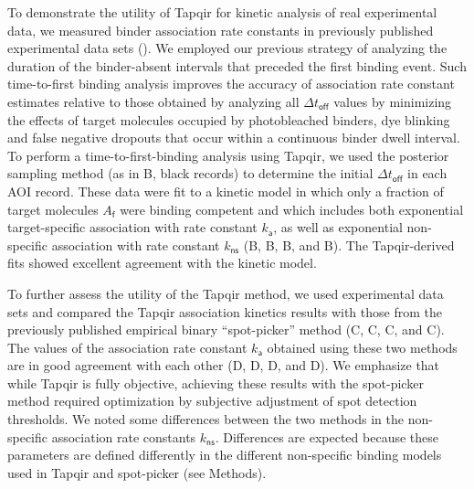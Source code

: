 To demonstrate the utility of Tapqir for kinetic analysis of real experimental data, we measured binder association rate constants in previously published experimental data sets ().  We employed our previous strategy  \citep{Friedman2012-if,Friedman2015-nx} of analyzing the duration of the binder-absent intervals that preceded the first binding event.  Such time-to-first binding analysis improves the accuracy of association rate constant estimates relative to those obtained by analyzing all $\Delta t_\mathsf{off}$ values by minimizing the effects of target molecules occupied by photobleached binders, dye blinking and false negative dropouts that occur within a continuous binder dwell interval.  To perform a time-to-first-binding analysis using Tapqir, we used the posterior sampling method (as in B, black records) to determine the initial $\Delta t_\mathsf{off}$ in each AOI record. These data were fit to a kinetic model \citep{Friedman2012-if,Friedman2015-nx} in which only a fraction of target molecules $A_\mathsf{f}$ were binding competent and which includes both exponential target-specific association with rate constant $k_\mathsf{a}$, as well as exponential non-specific association with rate constant $k_\mathsf{ns}$ (B, B, B, and B).  The Tapqir-derived fits showed excellent agreement with the kinetic model.  

To further assess the utility of the Tapqir method, we used experimental data sets and compared the Tapqir association kinetics results with those from the previously published empirical binary ``spot-picker'' method \citep{Friedman2015-nx} (C, C, C, and C). The values of the association rate constant $k_\mathsf{a}$ obtained using these two methods are in good agreement with each other (D, D, D, and D). We emphasize that while Tapqir is fully objective, achieving these results with the spot-picker method required optimization by subjective adjustment of spot detection thresholds.  We noted some differences between the two methods in the non-specific association rate constants $k_\mathsf{ns}$. Differences are expected because these parameters are defined differently in the different non-specific binding models used in Tapqir and  spot-picker (see Methods).



